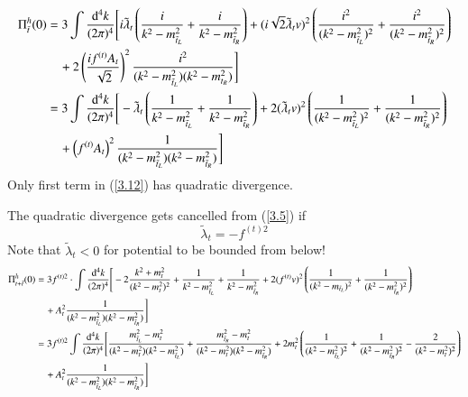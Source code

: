 \begin{align}
   \Pi^h_{\tilde t} (0) &= 3 \int \frac{\dd[4]{k}}{(2\pi)^4} \Bigg[ i \tilde \lambda_t \left( \frac{i}{k^2 - m^2_{\tilde{t}_L}} + \frac{i}{k^2 - m^2_{\tilde t_R}} \right) 
                         + (i\sqrt{2} \tilde \lambda_t v)^2 \left( \frac{i^2}{(k^2 - m^2_{\tilde t_L})^2} + \frac{i^2}{(k^2 - m^2_{\tilde t_R})^2} \right) \notag \\
                        &\quad + 2 \left( \frac{if^{(t)} A_t}{\sqrt{2}} \right)^2 \frac{i^2}{(k^2 - m^2_{\tilde t_L})(k^2 - m^2_{t_R})} \Bigg] \notag \\
                        &= 3 \int \frac{\dd[4]{k}}{(2\pi)^4} \Bigg[ - \tilde \lambda_{t} \left( \frac{1}{k^2 - m^2_{\tilde t_L}} + \frac{1}{k^2 - m^2_{\tilde t_R}} \right) 
                         + 2 (\tilde{\lambda}_t v)^2 \left( \frac{1}{(k^2 - m^2_{\tilde{t}_L})^2} + \frac{1}{(k^2 - m^2_{\tilde{t}_R})^2} \right) \notag \\
                        &\quad + \left(f^{(t)} A_t\right)^2 \frac{1}{(k^2 - m^2_{\tilde t_L})(k^2 - m^2_{\tilde t_R})} \Bigg] \label{3.12}
\end{align}
Only first term in (\ref{3.12}) has quadratic divergence.

The quadratic divergence gets cancelled from (\ref{3.5}) if
\begin{equation}
   \tilde \lambda_t = - f^{(t)2}
   \label{3.13}
\end{equation}
Note that $\tilde \lambda_t < 0$ for potential to be bounded from below!
\begin{align}
   \Pi_{t + \tilde{t}}^h(0) &= 3 f^{(t)2} \cdot \int \frac{\dd[4]{k}}{(2\pi)^4} \Bigg[ -2 \frac{k^2 + m_t^2}{(k^2 - m^2_t)^2} + \frac{1}{k^2 - m_{\tilde t_L}^2} + \frac{1}{k^2 - m^2_{\tilde t_R}} + 2 (f^{(t)}v)^2 \left( \frac{1}{(k^2 - m_{\tilde t_L})^2} + \frac{1}{(k^2 - m^2_{\tilde t_R})^2} \right) \notag \\
                            &\quad+ A^2_t \frac{1}{(k^2 - m_{\tilde t_L}^2)(k^2 - m^2_{\tilde t_R})} \Bigg] \notag \\
                            &=3 f^{(t)2} \int \frac{\dd[4]{k}}{(2\pi)^4} \Bigg[ \frac{m^2_{\tilde t_L} - m^2_t}{(k^2 - m_t^2)(k^2 - m^2_{\tilde t_L})} + \frac{m^2_{\tilde t_R}-m^2_t}{(k^2 - m_t^2)(k^2 - m^2_{\tilde t_R})} + 2m^2_t \left( \frac{1}{(k^2 - m^2_{\tilde t_L})^2} + \frac{1}{(k^2 - m^2_{\tilde t_R})^2} - \frac{2}{(k^2 - m^2_t)^2} \right)\notag \\
                            &\quad + A^2_t \frac{1}{(k^2 - m^2_{\tilde t_L})(k^2 - m^2_{\tilde t_R})} \Bigg] \label{3.14} 
\end{align}

